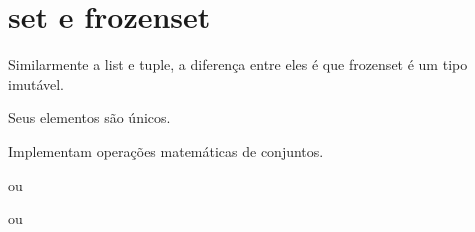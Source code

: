 \documentclass[letterpaper,10pt,brazil]{sphinxmanual}
\begin{document}
\begin{sphinxVerbatim}[commandchars=\\\{\}]
\end{sphinxVerbatim}


\chapter{set e frozenset}
\label{\detokenize{content/set_frozenset:set-e-frozenset}}\label{\detokenize{content/set_frozenset::doc}}
\begin{DUlineblock}{0em}
\item[] Similarmente a list e tuple, a diferença entre eles é que frozenset é um tipo imutável.
\item[] Seus elementos são únicos.
\item[] Implementam operações matemáticas de conjuntos.
\end{DUlineblock}

\begin{sphinxVerbatim}[commandchars=\\\{\}]
  
\end{sphinxVerbatim}

ou

\begin{sphinxVerbatim}[commandchars=\\\{\}]
  
\end{sphinxVerbatim}

\begin{sphinxVerbatim}[commandchars=\\\{\}]
  \PYG{p}{[}   \PYG{p}{]}
\end{sphinxVerbatim}

ou

\begin{sphinxVerbatim}[commandchars=\\\{\}]
     
\end{sphinxVerbatim}
\end{document}
